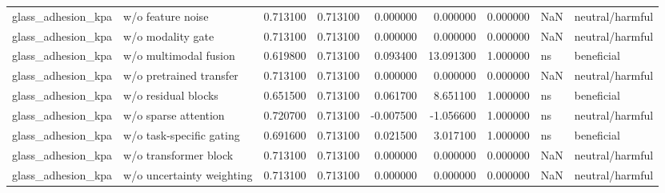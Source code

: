 \begin{table}
\begin{tabular}{llrrrrrll}
glass\_adhesion\_kpa & w/o feature noise & 0.713100 & 0.713100 & 0.000000 & 0.000000 & 0.000000 & NaN & neutral/harmful \\
glass\_adhesion\_kpa & w/o modality gate & 0.713100 & 0.713100 & 0.000000 & 0.000000 & 0.000000 & NaN & neutral/harmful \\
glass\_adhesion\_kpa & w/o multimodal fusion & 0.619800 & 0.713100 & 0.093400 & 13.091300 & 1.000000 & ns & beneficial \\
glass\_adhesion\_kpa & w/o pretrained transfer & 0.713100 & 0.713100 & 0.000000 & 0.000000 & 0.000000 & NaN & neutral/harmful \\
glass\_adhesion\_kpa & w/o residual blocks & 0.651500 & 0.713100 & 0.061700 & 8.651100 & 1.000000 & ns & beneficial \\
glass\_adhesion\_kpa & w/o sparse attention & 0.720700 & 0.713100 & -0.007500 & -1.056600 & 1.000000 & ns & neutral/harmful \\
glass\_adhesion\_kpa & w/o task-specific gating & 0.691600 & 0.713100 & 0.021500 & 3.017100 & 1.000000 & ns & beneficial \\
glass\_adhesion\_kpa & w/o transformer block & 0.713100 & 0.713100 & 0.000000 & 0.000000 & 0.000000 & NaN & neutral/harmful \\
glass\_adhesion\_kpa & w/o uncertainty weighting & 0.713100 & 0.713100 & 0.000000 & 0.000000 & 0.000000 & NaN & neutral/harmful \\
\bottomrule
\end{tabular}
\end{table}

